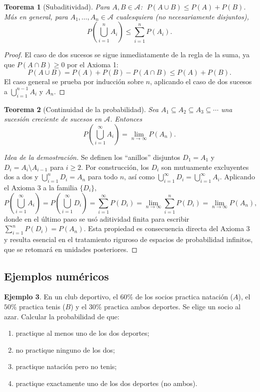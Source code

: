 \documentclass[11pt,a4paper]{article}
\theoremstyle{plain}
\newtheorem{teorema}{Teorema}[section]
\theoremstyle{definition}
\newtheorem{ejemplo}[teorema]{Ejemplo}
\theoremstyle{remark}
\begin{document}
\begin{teorema}[Subaditividad]
Para $A,B \in \mathcal{A}$: $\; P(A\cup B) \leq P(A) + P(B)$. Más en general, para $A_1,\dots,A_n \in \mathcal{A}$ cualesquiera (no necesariamente disjuntos),
\[
P\left(\bigcup_{i=1}^n A_i\right) \leq \sum_{i=1}^n P(A_i).
\]
\end{teorema}

\begin{proof}
El caso de dos sucesos se sigue inmediatamente de la regla de la suma, ya que $P(A\cap B) \geq 0$ por el Axioma 1:
\[
P(A\cup B) = P(A)+P(B)-P(A\cap B) \leq P(A)+P(B).
\]
El caso general se prueba por inducción sobre $n$, aplicando el caso de dos sucesos a $\bigcup_{i=1}^{n-1}A_i$ y $A_n$.
\end{proof}

\begin{teorema}[Continuidad de la probabilidad]
Sea $A_1 \subseteq A_2 \subseteq A_3 \subseteq \cdots$ una sucesión creciente de sucesos en $\mathcal{A}$. Entonces
\[
P\left(\bigcup_{i=1}^{\infty} A_i\right) = \lim_{n\to\infty} P(A_n).
\]
\end{teorema}

\begin{proof}[Idea de la demostración]
Se definen los ``anillos'' disjuntos $D_1=A_1$ y $D_i = A_i \setminus A_{i-1}$ para $i\geq 2$. Por construcción, los $D_i$ son mutuamente excluyentes dos a dos y $\bigcup_{i=1}^n D_i = A_n$ para todo $n$, así como $\bigcup_{i=1}^\infty D_i = \bigcup_{i=1}^\infty A_i$. Aplicando el Axioma 3 a la familia $\{D_i\}$,
\[
P\left(\bigcup_{i=1}^\infty A_i\right) = P\left(\bigcup_{i=1}^\infty D_i\right) = \sum_{i=1}^\infty P(D_i) = \lim_{n\to\infty}\sum_{i=1}^n P(D_i) = \lim_{n\to\infty} P(A_n),
\]
donde en el último paso se usó aditividad finita para escribir $\sum_{i=1}^n P(D_i) = P(A_n)$. Esta propiedad es consecuencia directa del Axioma 3 y resulta esencial en el tratamiento riguroso de espacios de probabilidad infinitos, que se retomará en unidades posteriores.
\end{proof}

\subsection{Ejemplos numéricos}

\begin{ejemplo}
En un club deportivo, el $60\%$ de los socios practica natación ($A$), el $50\%$ practica tenis ($B$) y el $30\%$ practica ambos deportes. Se elige un socio al azar. Calcular la probabilidad de que:
\begin{enumerate}
\item practique al menos uno de los dos deportes;
\item no practique ninguno de los dos;
\item practique natación pero no tenis;
\item practique exactamente uno de los dos deportes (no ambos).
\end{enumerate}
\end{ejemplo}
\end{document}
